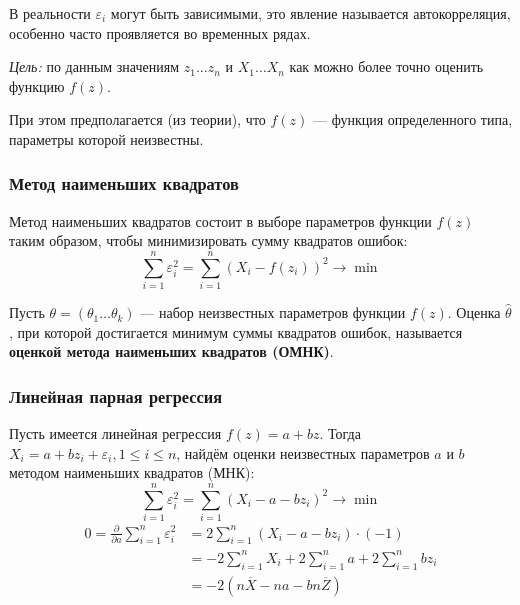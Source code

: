 \begin{remark}
    В реальности \(\varepsilon_i\) могут быть зависимыми, это явление называется автокорреляция, особенно часто проявляется во временных рядах.
\end{remark}

\textit{Цель:} по данным значениям \(z_1 \dots z_n\) и \(X_1 \dots X_n\) как можно более точно оценить функцию \(f(z)\).

\begin{remark}
    При этом предполагается (из теории), что \(f(z)\) --- функция определенного типа, параметры которой неизвестны.
\end{remark}

\subsubsection{Метод наименьших квадратов}

Метод наименьших квадратов состоит в выборе параметров функции \(f(z)\) таким образом, чтобы минимизировать сумму квадратов ошибок:
\[\sum_{i=1}^{n} \varepsilon_i^2 = \sum_{i=1}^{n} (X_i - f(z_i))^2 \to \min\]
\begin{definition}
    Пусть \(\theta = (\theta_1 \dots \theta_k)\) --- набор неизвестных параметров функции \(f(z)\). Оценка \(\hat{\theta}\), при которой достигается минимум суммы квадратов ошибок, называется \textbf{оценкой метода наименьших квадратов (ОМНК)}.
\end{definition}

\subsubsection{Линейная парная регрессия}

Пусть имеется линейная регрессия \(f(z) = a + bz\). Тогда \(X_i = a + bz_i + \varepsilon_i, 1 \leq i \leq n\), найдём оценки неизвестных параметров \(a\) и \(b\) методом наименьших квадратов (МНК):
\[\sum_{i=1}^{n} \varepsilon_i^2 = \sum_{i=1}^{n} (X_i - a - bz_i)^2 \to \min\]
\begin{align*}
    0 = \frac{\partial}{\partial a} \sum_{i=1}^{n} \varepsilon_i^2
     & = 2 \sum_{i=1}^{n} (X_i - a - b z_i) \cdot ( - 1)                     \\
     & = - 2 \sum_{i=1}^{n} X_i + 2 \sum_{i=1}^{n} a + 2 \sum_{i=1}^{n} bz_i \\
     & = - 2 \left(n \overline{X} - na - b n\overline{Z}\right)
\end{align*}

